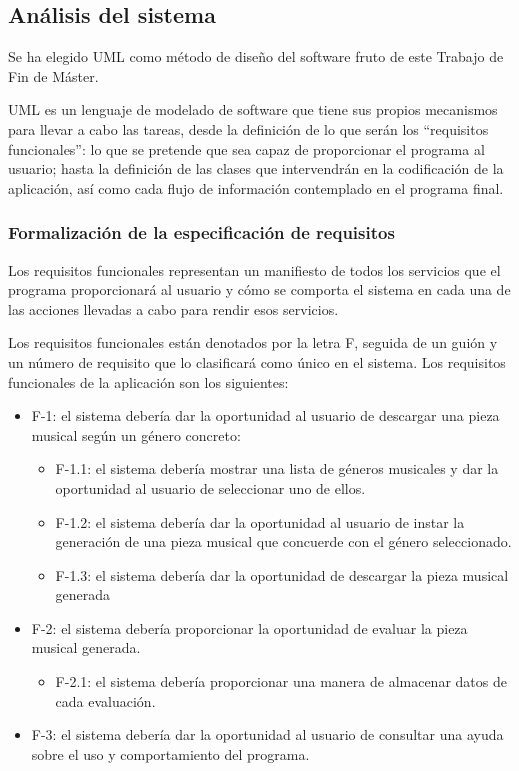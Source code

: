 \subsection{Análisis del sistema}
\label{analisis-del-sistema}

Se ha elegido UML como método de diseño del software fruto de este Trabajo de Fin de Máster.

UML es un lenguaje de modelado de software que tiene sus propios mecanismos para llevar a cabo las tareas, desde la definición de lo
que serán los ``requisitos funcionales'': lo que se pretende que sea capaz de proporcionar el programa al usuario; hasta la definición de las clases que intervendrán en la codificación de la aplicación, así como cada flujo de información contemplado en el programa final.

\subsubsection{Formalización de la especificación de requisitos}

Los requisitos funcionales representan un manifiesto de todos los servicios que el programa proporcionará al usuario y cómo se comporta el sistema en cada una de las acciones llevadas a cabo para rendir esos servicios.

Los requisitos funcionales están denotados por la letra F, seguida de un guión y un número de requisito que lo clasificará como único en el sistema. Los requisitos funcionales de la aplicación son los siguientes:

\begin{itemize}

    \item F-1: el sistema debería dar la oportunidad al usuario de descargar una pieza musical según un género concreto:
    \begin{itemize}
        \item F-1.1: el sistema debería mostrar una lista de géneros musicales y dar la oportunidad al usuario de seleccionar uno de ellos.
        \item F-1.2: el sistema debería dar la oportunidad al usuario de instar la generación de una pieza musical que concuerde con el género seleccionado.
        \item F-1.3: el sistema debería dar la oportunidad de descargar la pieza musical generada
    \end{itemize}
    
    \item F-2: el sistema debería proporcionar la oportunidad de evaluar la pieza musical generada.
    \begin{itemize}
        \item F-2.1: el sistema debería proporcionar una manera de almacenar datos de cada evaluación.
    \end{itemize}
       
    \item F-3: el sistema debería dar la oportunidad al usuario de consultar una ayuda sobre el uso y comportamiento del programa.

\end{itemize}

